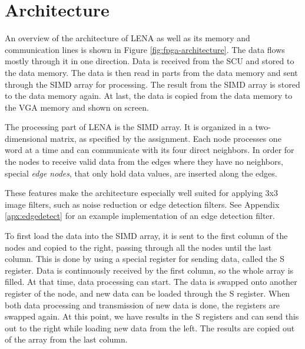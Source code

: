 \section{Architecture}



An overview of the architecture of \ac{LENA} as well as its memory and
communication lines is shown in Figure \ref{fig:fpga-architecture}. The data
flows mostly through it in one direction. Data is received from the SCU and
stored to the data memory. The data is then read in parts from the data memory
and sent through the \ac{SIMD} array for processing. The result from the
\ac{SIMD} array is stored to the data memory again.  At last, the data is copied
from the data memory to the \ac{VGA} memory and shown on screen.

The processing part of \ac{LENA} is the \ac{SIMD} array. It is organized
in a two-dimensional matrix, as specified by the assignment. Each node
processes one word at a time and can communicate with its four direct
neighbors. In order for the nodes to receive valid data from the edges
where they have no neighbors, special \emph{edge nodes}, that only hold
data values, are inserted along the edges.

These features make the architecture especially well suited for applying
3x3 image filters, such as noise reduction or edge detection filters.
See Appendix \ref{apx:edgedetect} for an example implementation of an edge
detection filter.

To first load the data into the \ac{SIMD} array, it is sent to the first column
of the nodes and copied to the right, passing through all the nodes until the
last column. This is done by using a special register for sending data, called
the S register. Data is continuously received by the first column, so the whole
array is filled. At that time, data processing can start. The data is swapped
onto another register of the node, and new data can be loaded through the S
register. When both data processing and transmission of new data is done, the
registers are swapped again. At this point, we have results in the S registers
and can send this out to the right while loading new data from the left. The
results are copied out of the array from the last column.

